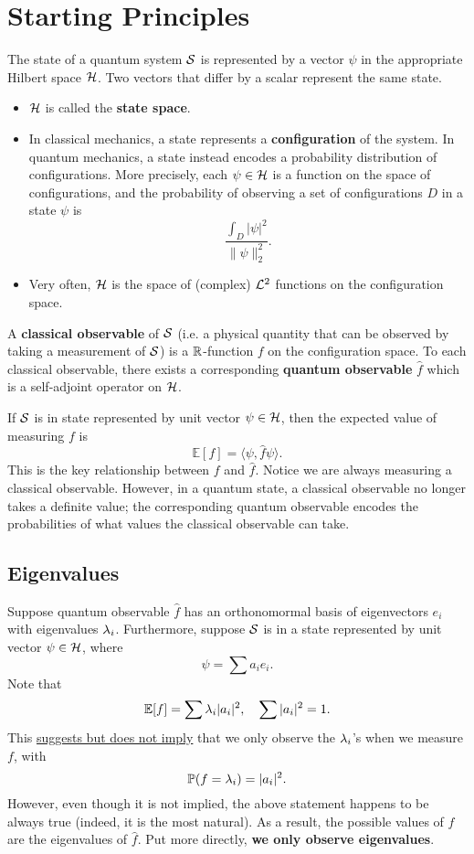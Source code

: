 \section{Starting Principles}

The state of a quantum system ${\mathcal S}$ is represented by a vector $\psi$ in the appropriate Hilbert space ${\mathcal H}$. Two vectors that differ by a scalar represent the same state.
\begin{itemize}
    \item ${\mathcal H}$ is called the \textbf{state space}.
    \item In classical mechanics, a state represents a \textbf{configuration} of the system. In quantum mechanics, a state instead encodes a probability distribution of configurations. More precisely, each $\psi \in {\mathcal H}$ is a function on the space of configurations, and the probability of observing a set of configurations $D$ in a state $\psi$ is
    \[
        \frac{\int_D |\psi|^2}{\|\psi\|_2^2}.
    \]
    \item Very often, ${\mathcal H}$ is the space of (complex) ${\mathcal L}^2$ functions on the configuration space.
\end{itemize}

A \textbf{classical observable} of ${\mathcal S}$ (i.e. a physical quantity that can be observed by taking a measurement of ${\mathcal S}$) is a ${\mathbb R}$-function $f$ on the configuration space. To each classical observable, there exists a corresponding \textbf{quantum observable} $\hat{f}$ which is a self-adjoint operator on ${\mathcal H}$.

If ${\mathcal S}$ is in state represented by unit vector $\psi \in {\mathcal H}$, then the expected value of measuring $f$ is
\[
    \mathbb E[f] = \langle \psi, \hat{f} \psi \rangle.
\]
This is the key relationship between $f$ and $\hat{f}$. Notice we are always measuring a classical observable. However, in a quantum state, a classical observable no longer takes a definite value; the corresponding quantum observable encodes the probabilities of what values the classical observable can take.

\subsection{Eigenvalues}

Suppose quantum observable $\hat{f}$ has an orthonomormal basis of eigenvectors $e_i$ with eigenvalues $\lambda_i$. Furthermore, suppose ${\mathcal S}$ is in a state represented by unit vector $\psi \in {\mathcal H}$, where
\[
    \psi = \sum a_i e_i.
\]
Note that
\[
    \mathbb E[f] = \sum \lambda_i |a_i|^2, \quad \sum |a_i|^2 = 1.
\]
This \underline{suggests but does not imply} that we only observe the $\lambda_i$'s when we measure $f$, with
\[
    \mathbb P(f = \lambda_i) = |a_i|^2.
\]
However, even though it is not implied, the above statement happens to be always true (indeed, it is the most natural). As a result, the possible values of $f$ are the eigenvalues of $\hat{f}$. Put more directly, \textbf{we only observe eigenvalues}.

